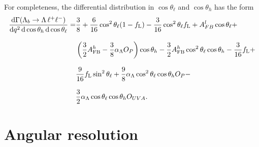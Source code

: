 For completeness, the differential distribution in $\cos\theta_\ell$ and $\cos\theta_h$ has the form
\begin{align}
\frac{\mathrm{d}\Gamma(\Lambda_{b}\rightarrow \Lambda \,\ell^{+}\ell^{-})}{\mathrm{d}q^2\,\mathrm{d}\cos\theta_h\, \mathrm{d}\cos\theta_\ell}=&
\frac{3}{8}+\frac{6}{16}\cos^2\theta_\ell(1-f_{\rm L})-\frac{3}{16}\cos^2\theta_\ell f_{\rm L}
+A_{FB}^l\cos\theta_\ell+ \nonumber \\[8pt]
& \left(\frac{3}{2}A_{\rm FB}^h-\frac{3}{8}\alpha_\Lambda O_P\right)\cos\theta_h
-\frac{3}{2}A_{\rm FB}^h\cos^2\theta_\ell\cos\theta_h-\frac{3}{16}f_{\rm L}+ \nonumber \\[8pt]
& \frac{9}{16}f_{\rm L}\sin^2\theta_\ell+\frac{9}{8}\alpha_\Lambda \cos^2\theta_\ell\cos\theta_h O_P- \nonumber \\[8pt]
& \frac{3}{2}\alpha_\Lambda \cos\theta_\ell\cos\theta_h O_{UVA}.
\label{eq:2DcosThetaLandB}
\end{align}


\section{Angular resolution}
\label{sec:and_resolution}

